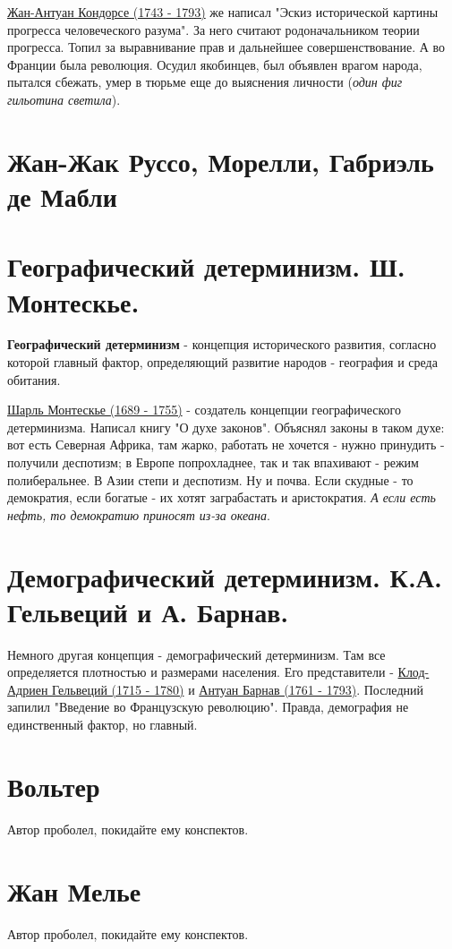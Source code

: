 \underline{Жан-Антуан Кондорсе (1743 - 1793)} же написал "Эскиз исторической картины прогресса человеческого разума". За него считают родоначальником теории прогресса. Топил за выравнивание прав и дальнейшее совершенствование. А во Франции была революция. Осудил якобинцев, был объявлен врагом народа, пытался сбежать, умер в тюрьме еще до выяснения личности (\textit{один фиг гильотина светила}). 

\section{Жан-Жак Руссо, Морелли, Габриэль де Мабли}
\section{Географический детерминизм. Ш. Монтескье.}
\textbf{Географический детерминизм} - концепция исторического развития, согласно которой главный фактор, определяющий развитие народов - география и среда обитания.

\underline{Шарль Монтескье (1689 - 1755)} - создатель концепции географического детерминизма. Написал книгу "О духе законов". Объяснял законы в таком духе: вот есть Северная Африка, там жарко, работать не хочется - нужно принудить - получили деспотизм; в Европе попрохладнее, так и так впахивают - режим полиберальнее. В Азии степи и деспотизм. Ну и почва. Если скудные - то демократия, если богатые - их хотят заграбастать и аристократия. \textit{А если есть нефть, то демократию приносят из-за океана}.  

\section{Демографический детерминизм.  К.А. Гельвеций и А. Барнав.}
Немного другая концепция - демографический детерминизм.  Там все определяется плотностью и размерами населения. Его представители - \underline{Клод-Адриен Гельвеций (1715 - 1780)} и \underline{Антуан Барнав (1761 - 1793)}. Последний запилил "Введение во Французскую революцию". Правда, демография не единственный фактор, но главный.

\section{Вольтер}
Автор проболел, покидайте ему конспектов.
\section{Жан Мелье}
Автор проболел, покидайте ему конспектов.
